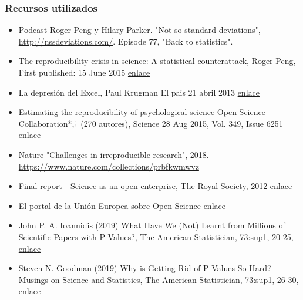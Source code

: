 \documentclass[9pt]{beamer}
\begin{document}
\begin{frame}
  \frametitle{Recursos utilizados}
  \begin{itemize}

\item Podcast Roger Peng y Hilary Parker. "Not so standard deviations", \href{http://nssdeviations.com/}{http://nssdeviations.com/}. Episode 77, "Back to statistics".

\item The reproducibility crisis in science: A statistical counterattack, Roger Peng, 
First published: 15 June 2015 \href{https://doi.org/10.1111/j.1740-9713.2015.00827.x}{enlace}

\item La depresión del Excel, Paul Krugman El pais 21 abril 2013 \href{https://elpais.com/economia/2013/04/19/actualidad/1366398440_370422.html}{enlace}

\item Estimating the reproducibility of psychological science Open Science Collaboration*,†
(270 autores), Science 28 Aug 2015, Vol. 349, Issue 6251 \href{http://science.sciencemag.org/content/349/6251/aac4716}{enlace}

\item Nature "Challenges in irreproducible research", 2018. \href{https://www.nature.com/collections/prbfkwmwvz}{https://www.nature.com/collections/prbfkwmwvz}

  \item Final report - Science as an open enterprise, The Royal Society, 2012 \href{https://royalsociety.org/topics-policy/projects/science-public-enterprise/report/}{enlace}

  \item El portal de la Unión Europea sobre Open Science \href{https://ec.europa.eu/research/openscience/index.cfm}{enlace}

  \item John P. A. Ioannidis (2019) What Have We (Not) Learnt from
    Millions of Scientific Papers with P Values?, The American
    Statistician, 73:sup1, 20-25, \href{https://doi.org/10.1080/00031305.2018.1447512}{enlace}

  \item Steven N. Goodman (2019) Why is Getting Rid of P-Values So Hard? Musings on Science and Statistics, The American Statistician, 73:sup1, 26-30, \href{https://doi.org/10.1080/00031305.2018.1558111}{enlace}

  \end{itemize}
\end{frame}
\end{document}
